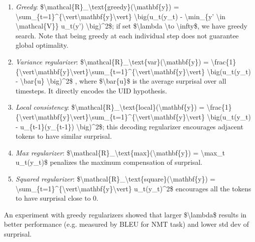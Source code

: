 \begin{enumerate}
\tightlist
\item
  \emph{Greedy}: \$\textbackslash mathcal\{R\}\_\textbackslash text\{greedy\}(\textbackslash mathbf\{y\}) = \textbackslash sum\_\{t=1\}\^{}\{\textbackslash vert\textbackslash mathbf\{y\}\textbackslash vert\} \textbackslash big(u\_t(y\_t) - \textbackslash min\_\{y' \textbackslash in \textbackslash mathcal\{V\}\} u\_t(y') \textbackslash big)\^{}2\$; if set \$\textbackslash lambda \textbackslash to \textbackslash infty\$, we have greedy search. Note that being greedy at each individual step does not guarantee global optimality.
\item
  \emph{Variance regularizer}: \$\textbackslash mathcal\{R\}\_\textbackslash text\{var\}(\textbackslash mathbf\{y\}) = \textbackslash frac\{1\}\{\textbackslash vert\textbackslash mathbf\{y\}\textbackslash vert\}\textbackslash sum\_\{t=1\}\^{}\{\textbackslash vert\textbackslash mathbf\{y\}\textbackslash vert\} \textbackslash big(u\_t(y\_t) - \textbackslash bar\{u\} \textbackslash big)\^{}2\$ , where \$\textbackslash bar\{u\}\$ is the average surprisal over all timesteps. It directly encodes the UID hypothesis.
\item
  \emph{Local consistency}: \$\textbackslash mathcal\{R\}\_\textbackslash text\{local\}(\textbackslash mathbf\{y\}) = \textbackslash frac\{1\}\{\textbackslash vert\textbackslash mathbf\{y\}\textbackslash vert\}\textbackslash sum\_\{t=1\}\^{}\{\textbackslash vert\textbackslash mathbf\{y\}\textbackslash vert\} \textbackslash big(u\_t(y\_t) - u\_\{t-1\}(y\_\{t-1\}) \textbackslash big)\^{}2\$; this decoding regularizer encourages adjacent tokens to have similar surprisal.
\item
  \emph{Max regularizer}: \$\textbackslash mathcal\{R\}\_\textbackslash text\{max\}(\textbackslash mathbf\{y\}) = \textbackslash max\_t u\_t(y\_t)\$ penalizes the maximum compensation of surprisal.
\item
  \emph{Squared regularizer}: \$\textbackslash mathcal\{R\}\_\textbackslash text\{square\}(\textbackslash mathbf\{y\}) = \textbackslash sum\_\{t=1\}\^{}\{\textbackslash vert\textbackslash mathbf\{y\}\textbackslash vert\} u\_t(y\_t)\^{}2\$ encourages all the tokens to have surprisal close to 0.
\end{enumerate}

An experiment with greedy regularizers showed that larger \$\textbackslash lambda\$ results in better performance (e.g. measured by BLEU for NMT task) and lower std dev of surprisal.

